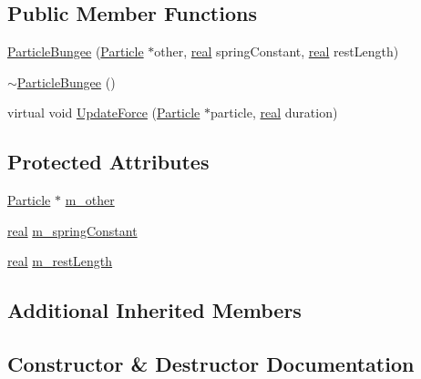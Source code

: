 \subsection*{Public Member Functions}
\begin{DoxyCompactItemize}
\item 
\hyperlink{classrum_1_1_particle_bungee_a8908b5c848fb6ebc45f420e0924e033e}{Particle\+Bungee} (\hyperlink{classrum_1_1_particle}{Particle} $\ast$other, \hyperlink{namespacerum_a7e8cca23573d5eaead0f138cbaa4862c}{real} spring\+Constant, \hyperlink{namespacerum_a7e8cca23573d5eaead0f138cbaa4862c}{real} rest\+Length)
\item 
\hyperlink{classrum_1_1_particle_bungee_aaff4a95227aaec80896d0030ded6c6b3}{$\sim$\+Particle\+Bungee} ()
\item 
virtual void \hyperlink{classrum_1_1_particle_bungee_a631e7f4c92c881b9a62471e2f75e2a2c}{Update\+Force} (\hyperlink{classrum_1_1_particle}{Particle} $\ast$particle, \hyperlink{namespacerum_a7e8cca23573d5eaead0f138cbaa4862c}{real} duration)
\end{DoxyCompactItemize}
\subsection*{Protected Attributes}
\begin{DoxyCompactItemize}
\item 
\hyperlink{classrum_1_1_particle}{Particle} $\ast$ \hyperlink{classrum_1_1_particle_bungee_a86d11a089a58dca74854d94630d9f125}{m\+\_\+other}
\item 
\hyperlink{namespacerum_a7e8cca23573d5eaead0f138cbaa4862c}{real} \hyperlink{classrum_1_1_particle_bungee_a4a77b3fb166e4e56dc3a57f5807d985f}{m\+\_\+spring\+Constant}
\item 
\hyperlink{namespacerum_a7e8cca23573d5eaead0f138cbaa4862c}{real} \hyperlink{classrum_1_1_particle_bungee_a4392eb2dc76c9371acfddcb852bb3737}{m\+\_\+rest\+Length}
\end{DoxyCompactItemize}
\subsection*{Additional Inherited Members}


\subsection{Constructor \& Destructor Documentation}
\mbox{\label{classrum_1_1_particle_bungee_a8908b5c848fb6ebc45f420e0924e033e}} 
